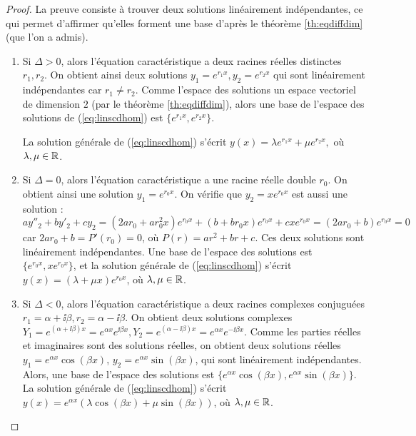 \documentclass[class=report,crop=false]{standalone}
\begin{document}
\begin{proof}
La preuve consiste à trouver deux solutions linéairement indépendantes,
ce qui permet d'affirmer qu'elles forment une base d'après
le théorème \ref{th:eqdiffdim} (que l'on a admis).
\begin{enumerate}
  \item Si $\Delta>0$, alors l'équation caractéristique a deux racines réelles
distinctes $r_1, r_2$. On obtient ainsi deux solutions $y_1=e^{r_1x},
y_2=e^{r_2x}$ qui sont linéairement indépendantes car $r_1 \neq r_2$.
Comme l'espace des solutions un espace vectoriel de dimension $2$
(par le théorème \ref{th:eqdiffdim}), alors une base de
l'espace des solutions de (\ref{eq:linscdhom})
est $\big\{e^{r_1x}, e^{r_2x}\big\}$.

La solution générale de  (\ref{eq:linscdhom}) s'écrit
$y(x) = \lambda e^{r_1x} + \mu e^{r_2x},$ où $\lambda,
\mu\in\mathbb{R}$.

  \item Si $\Delta=0$, alors l'équation caractéristique a
une racine réelle double $r_0$. On
obtient ainsi une solution $y_1=e^{r_0x}$. On vérifie que $y_2=xe^{r_0x}$
est aussi une solution :
$ay''_2+by'_2+cy_2=(2ar_0+ar_0^2x)e^{r_0x}+(b+br_0x)e^{r_0x}+cxe^{r_0x}
=(2ar_0+b)e^{r_0x}=0$ car $2ar_0+b=P'(r_0)=0$, où $P(r) = ar^2+br+c$.
Ces deux solutions sont linéairement indépendantes.
Une base de l'espace des solutions est $\big\{e^{r_0x}, xe^{r_0x}\big\}$,
et la solution générale de  (\ref{eq:linscdhom}) s'écrit
$y(x) = (\lambda  + \mu x) e^{r_0x}$, où $\lambda,\mu \in\mathbb{R}$.

  \item Si $\Delta<0$, alors l'équation caractéristique a deux
racines complexes conjuguées $r_1=\alpha+\ii\beta, r_2=\alpha-\ii\beta$.
On obtient deux solutions complexes $Y_1=e^{(\alpha+\ii\beta)x}=e^{\alpha x}e^{\ii\beta x},
Y_2=e^{(\alpha-\ii\beta)x}=e^{\alpha x}e^{-\ii\beta x}$.
Comme les parties réelles et imaginaires sont des
solutions réelles, on obtient deux solutions réelles
$y_1=e^{\alpha x}\cos(\beta x)$, $y_2=e^{\alpha x}\sin(\beta x)$, qui sont
linéairement indépendantes.
Alors, une base de l'espace des solutions est
$\big\{e^{\alpha x}\cos(\beta x), e^{\alpha x}\sin(\beta x)\big\}$.
La solution générale de (\ref{eq:linscdhom}) s'écrit
$y(x)=e^{\alpha x}(\lambda \cos(\beta x) +
\mu\sin(\beta x))$, où $\lambda,\mu \in \mathbb{R}$.
\end{enumerate}
\end{proof}

\end{document}
